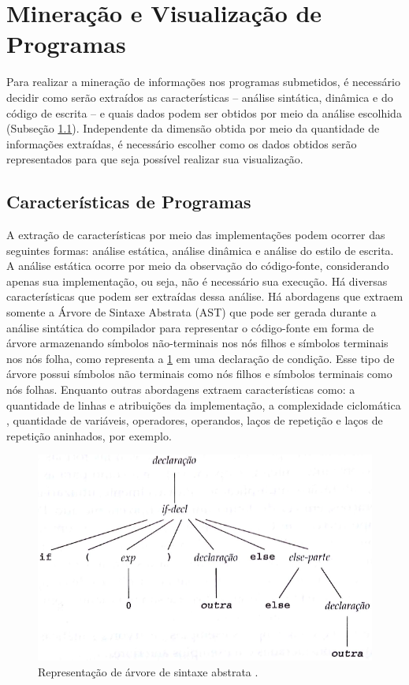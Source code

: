 	\section{Mineração e Visualização de Programas}
	\label{sec:MinVisual}
		Para realizar a mineração de informações nos programas submetidos, é necessário
		decidir como serão extraídos as características -- análise sintática, dinâmica e
		do código de escrita -- e quais dados podem ser obtidos por meio da análise
		escolhida (Subseção \ref{subSec:Caracteristicas}). Independente da dimensão
		obtida por meio da quantidade de informações extraídas, é necessário escolher
		como os dados obtidos serão representados para que seja possível realizar sua visualização.
		
		\subsection{Características de Programas}
		\label{subSec:Caracteristicas}

			A extração de características por meio das implementações podem ocorrer das
			seguintes formas: análise estática, análise dinâmica e análise do estilo de escrita.
			A análise estática ocorre por meio da observação do código-fonte, considerando
			apenas sua implementação, ou seja, não é necessário sua execução. Há diversas
			características que podem ser extraídas dessa análise. Há abordagens que extraem
			somente a Árvore de Sintaxe Abstrata (AST) que pode ser gerada durante a análise
			sintática do compilador para representar o código-fonte em forma de árvore
			armazenando símbolos não-terminais nos nós filhos e símbolos terminais nos
			nós folha, como representa a \cref{fig:AST} em uma declaração de condição.
			Esse tipo de árvore possui símbolos não terminais como nós filhos
			e símbolos terminais como nós folhas. Enquanto outras abordagens extraem
			características como: a quantidade de linhas e atribuições da implementação,
			a complexidade ciclomática \cite{mccabe}, quantidade de variáveis, operadores,
			operandos, laços de repetição e laços de repetição aninhados, por exemplo.
						
			\begin{figure}[h]
				\centering
				\includegraphics[width=0.7\linewidth]{imagem/AST}
				\captionsetup{justification=centering}
				\caption[Representação de árvore de sintaxe abstrata]{Representação
				de árvore de sintaxe abstrata \cite{louden2004}.}
				\label{fig:AST}
			\end{figure}
			

